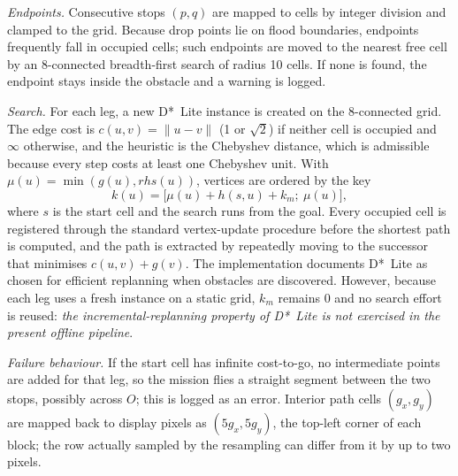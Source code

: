 \emph{Endpoints.} Consecutive stops $(p,q)$ are mapped to cells by integer division and clamped to the grid. Because drop points lie on flood boundaries, endpoints frequently fall in occupied cells; such endpoints are moved to the nearest free cell by an 8-connected breadth-first search of radius 10 cells. If none is found, the endpoint stays inside the obstacle and a warning is logged.

\emph{Search.} For each leg, a new D*~Lite instance \cite{koenig2002dstar,koenig2005fast} is created on the 8-connected grid. The edge cost is $c(u,v)=\lVert u-v\rVert$ (1 or $\sqrt2$) if neither cell is occupied and $\infty$ otherwise, and the heuristic is the Chebyshev distance, which is admissible because every step costs at least one Chebyshev unit. With $\mu(u)=\min(g(u),rhs(u))$, vertices are ordered by the key
\begin{equation}
k(u)=\big[\mu(u)+h(s,u)+k_m;\ \mu(u)\big],
\label{eq:key}
\end{equation}
where $s$ is the start cell and the search runs from the goal. Every occupied cell is registered through the standard vertex-update procedure before the shortest path is computed, and the path is extracted by repeatedly moving to the successor that minimises $c(u,v)+g(v)$. The implementation documents D*~Lite as chosen for efficient replanning when obstacles are discovered. However, because each leg uses a fresh instance on a static grid, $k_m$ remains $0$ and no search effort is reused: \emph{the incremental-replanning property of D*~Lite is not exercised in the present offline pipeline}.

\emph{Failure behaviour.} If the start cell has infinite cost-to-go, no intermediate points are added for that leg, so the mission flies a straight segment between the two stops, possibly across $O$; this is logged as an error. Interior path cells $(g_x,g_y)$ are mapped back to display pixels as $(5g_x,5g_y)$, the top-left corner of each block; the row actually sampled by the resampling can differ from it by up to two pixels.



